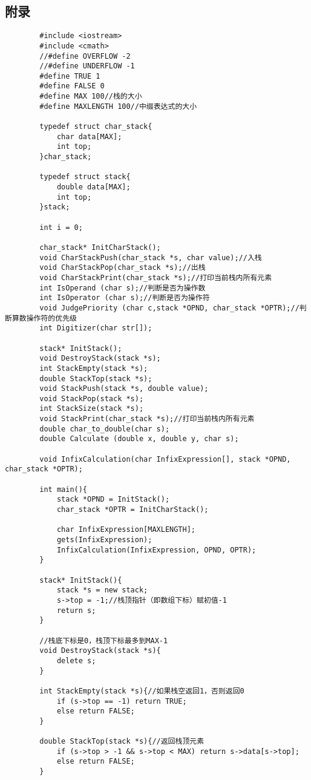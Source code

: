 \documentclass[10pt,a4paper]{article}
\begin{document}
	\subsection{附录}
	\begin{verbatim}
		#include <iostream>
		#include <cmath>
		//#define OVERFLOW -2
		//#define UNDERFLOW -1
		#define TRUE 1
		#define FALSE 0
		#define MAX 100//栈的大小
		#define MAXLENGTH 100//中缀表达式的大小
		
		typedef struct char_stack{
			char data[MAX];
			int top;
		}char_stack;
		
		typedef struct stack{
			double data[MAX];
			int top;
		}stack;
		
		int i = 0;
		
		char_stack* InitCharStack();
		void CharStackPush(char_stack *s, char value);//入栈
		void CharStackPop(char_stack *s);//出栈
		void CharStackPrint(char_stack *s);//打印当前栈内所有元素
		int IsOperand (char s);//判断是否为操作数
		int IsOperator (char s);//判断是否为操作符
		void JudgePriority (char c,stack *OPND, char_stack *OPTR);//判断算数操作符的优先级
		int Digitizer(char str[]);
		
		stack* InitStack();
		void DestroyStack(stack *s);
		int StackEmpty(stack *s);
		double StackTop(stack *s);
		void StackPush(stack *s, double value);
		void StackPop(stack *s);
		int StackSize(stack *s);
		void StackPrint(char_stack *s);//打印当前栈内所有元素
		double char_to_double(char s);
		double Calculate (double x, double y, char s);
		
		void InfixCalculation(char InfixExpression[], stack *OPND, char_stack *OPTR);
		
		int main(){
			stack *OPND = InitStack();
			char_stack *OPTR = InitCharStack();
			
			char InfixExpression[MAXLENGTH];
			gets(InfixExpression);
			InfixCalculation(InfixExpression, OPND, OPTR);
		}
		
		stack* InitStack(){
			stack *s = new stack;
			s->top = -1;//栈顶指针（即数组下标）赋初值-1
			return s;
		}
		
		//栈底下标是0，栈顶下标最多到MAX-1
		void DestroyStack(stack *s){
			delete s;
		}
		
		int StackEmpty(stack *s){//如果栈空返回1，否则返回0
			if (s->top == -1) return TRUE;
			else return FALSE;
		}
		
		double StackTop(stack *s){//返回栈顶元素
			if (s->top > -1 && s->top < MAX) return s->data[s->top];
			else return FALSE;
		}
		

\end{verbatim}
\end{document}
